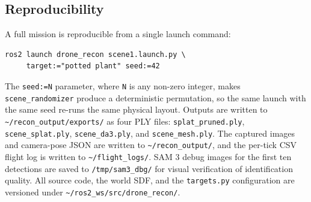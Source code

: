 \documentclass[conference]{IEEEtran}
\begin{document}
\begin{table}[!t]
\caption{Simulator comparison for this project (qualitative)}
\label{tab:sims}
\centering
{}
\end{table}

\subsection{Reproducibility}

A full mission is reproducible from a single launch command:
\begin{verbatim}
ros2 launch drone_recon scene1.launch.py \
     target:="potted plant" seed:=42
\end{verbatim}
The \texttt{seed:=N} parameter, where \texttt{N} is any non-zero
integer, makes \texttt{scene\_randomizer} produce a deterministic
permutation, so the same launch with the same seed re-runs the same
physical layout. Outputs are written to
\texttt{\textasciitilde/recon\_output/exports/} as four PLY files:
\texttt{splat\_pruned.ply}, \texttt{scene\_splat.ply},
\texttt{scene\_da3.ply}, and \texttt{scene\_mesh.ply}. The captured
images and camera-pose JSON are written to
\texttt{\textasciitilde/recon\_output/}, and the per-tick CSV flight
log is written to \texttt{\textasciitilde/flight\_logs/}. SAM 3 debug
images for the first ten detections are saved to
\texttt{/tmp/sam3\_dbg/} for visual verification of identification
quality. All source code, the world SDF, and the \texttt{targets.py}
configuration are versioned under
\texttt{\textasciitilde/ros2\_ws/src/drone\_recon/}.
\end{document}
